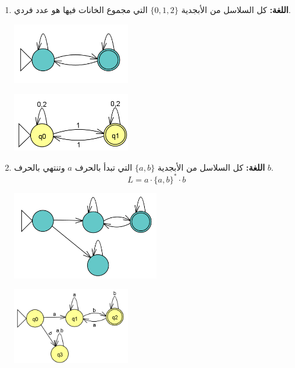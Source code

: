 \documentclass[12pt]{article}
\begin{document}
\begin{enumerate}[itemsep=3em]
\begin{enumerate}[itemsep=3em]
\begin{enumerate}
\item
\textbf{اللغة:} كل السلاسل من الأبجدية $\{0, 1, 2\}$ التي مجموع الخانات فيها هو عدد فردي.
\begin{center}
\includegraphics[width=0.4\textwidth]{../../../images/DFAs/ex1_p2_q1.png}
\end{center}
\ifwithsols
\begin{solution}
    \begin{center}
        \includegraphics[width=0.4\textwidth]{../../../images/DFAs/ex1_p2_q2_sol.png}
    \end{center}
\end{solution}
\clearpage
\fi

\item
\textbf{اللغة:} كل السلاسل من الأبجدية $\{a, b\}$ التي تبدأ بالحرف $a$ وتنتهي بالحرف $b$.
\[ L = a \cdot \{a, b\}^* \cdot b \]
\begin{center}
\includegraphics[width=0.5\textwidth]{../../../images/DFAs/ex1_p2_q3.png}
\end{center}
\ifwithsols
\begin{solution}
    \begin{center}
        \includegraphics[width=0.4\textwidth]{../../../images/DFAs/ex1_p2_q3_sol.png}
    \end{center}
\end{solution}
\fi


\end{enumerate}
\end{enumerate}
\end{enumerate}
\end{document}
